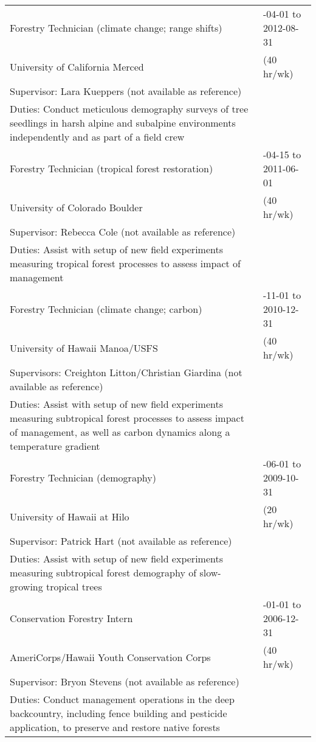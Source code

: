 \documentclass[10pt,english]{article}
\providecommand{\tabularnewline}{\\}
\begin{document}
\renewcommand{\arraystretch}{1.2}
\begin{tabularx}{\textwidth}{@{}>{\raggedright}p{4.5in} >{\raggedleft}X@{}}

Forestry Technician (climate change; range shifts) & 2012-04-01 to 2012-08-31 \tabularnewline
\addtolength{\leftskip}{5ex}University of California Merced & (40 hr/wk) \tabularnewline
\addtolength{\leftskip}{5ex}Supervisor: Lara Kueppers (not available as reference) & \tabularnewline
\addtolength{\leftskip}{5ex}Duties: Conduct meticulous demography surveys of tree seedlings in harsh alpine and subalpine environments independently and as part of a field crew  & \tabularnewline

Forestry Technician (tropical forest restoration) & 2011-04-15 to 2011-06-01 \tabularnewline
\addtolength{\leftskip}{5ex} University of Colorado Boulder & (40 hr/wk) \tabularnewline
\addtolength{\leftskip}{5ex}Supervisor: Rebecca Cole (not available as reference) & \tabularnewline
\addtolength{\leftskip}{5ex}Duties: Assist with setup of new field experiments measuring tropical forest processes to assess impact of management & \tabularnewline

Forestry Technician (climate change; carbon) & 2009-11-01 to 2010-12-31 \tabularnewline
\addtolength{\leftskip}{5ex} University of Hawaii Manoa/USFS & (40 hr/wk) \tabularnewline
\addtolength{\leftskip}{5ex}Supervisors: Creighton Litton/Christian Giardina (not available as reference) & \tabularnewline
\addtolength{\leftskip}{5ex}Duties: Assist with setup of new field experiments measuring subtropical forest processes to assess impact of management, as well as carbon dynamics along a temperature gradient & \tabularnewline

Forestry Technician (demography) & 2009-06-01 to 2009-10-31 \tabularnewline
\addtolength{\leftskip}{5ex} University of Hawaii at Hilo & (20 hr/wk) \tabularnewline
\addtolength{\leftskip}{5ex}Supervisor: Patrick Hart (not available as reference) & \tabularnewline
\addtolength{\leftskip}{5ex}Duties: Assist with setup of new field experiments measuring subtropical forest demography of slow-growing tropical trees & \tabularnewline

Conservation Forestry Intern & 2006-01-01 to 2006-12-31 \tabularnewline
\addtolength{\leftskip}{5ex} AmeriCorps/Hawaii Youth Conservation Corps & (40 hr/wk) \tabularnewline
\addtolength{\leftskip}{5ex}Supervisor: Bryon Stevens (not available as reference) & \tabularnewline
\addtolength{\leftskip}{5ex}Duties: Conduct management operations in the deep backcountry, including fence building and pesticide application, to preserve and restore native forests & \tabularnewline

\end{tabularx}
\end{document}
